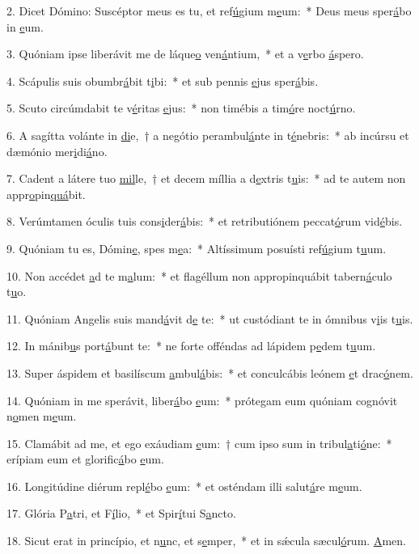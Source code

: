 2. Dicet Dómino: Suscéptor meus es tu, et ref\uline{ú}gium m\uline{e}um:~* Deus meus sper\uline{á}bo in \uline{e}um.\par 
3. Quóniam ipse liberávit me de láque\uline{o} ven\uline{á}ntium,~* et a v\uline{e}rbo \uline{á}spero.\par 
4. Scápulis suis obumbr\uline{á}bit t\uline{i}bi:~* et sub pennis \uline{e}jus sper\uline{á}bis.\par 
5. Scuto circúmdabit te v\uline{é}ritas \uline{e}jus:~* non timébis a tim\uline{ó}re noct\uline{ú}rno.\par 
6. A sagítta volánte in \uline{di}e,~† a negótio perambul\uline{á}nte in t\uline{é}nebris:~* ab incúrsu et dæmónio mer\uline{i}di\uline{á}no.\par 
7. Cadent a látere tuo \uline{mil}le,~† et decem míllia a d\uline{e}xtris t\uline{u}is:~* ad te autem non appr\uline{o}pin\uline{quá}bit.\par 
8. Verúmtamen óculis tuis cons\uline{i}der\uline{á}bis:~* et retributiónem peccat\uline{ó}rum vid\uline{é}bis.\par 
9. Quóniam tu es, Dómin\uline{e}, spes m\uline{e}a:~* Altíssimum posuísti ref\uline{ú}gium t\uline{u}um.\par 
10. Non accédet \uline{a}d te m\uline{a}lum:~* et flagéllum non appropinquábit tabern\uline{á}culo t\uline{u}o.\par 
11. Quóniam Angelis suis mand\uline{á}vit d\uline{e} te:~* ut custódiant te in ómnibus v\uline{i}is t\uline{u}is.\par 
12. In mánib\uline{u}s port\uline{á}bunt te:~* ne forte offéndas ad lápidem p\uline{e}dem t\uline{u}um.\par 
13. Super áspidem et basilíscum \uline{a}mbul\uline{á}bis:~* et conculcábis leónem \uline{e}t drac\uline{ó}nem.\par 
14. Quóniam in me sperávit, liber\uline{á}bo \uline{e}um:~* prótegam eum quóniam cognóvit n\uline{o}men m\uline{e}um.\par 
15. Clamábit ad me, et ego exáudiam \uline{e}um:~† cum ipso sum in tribul\uline{a}ti\uline{ó}ne:~* erípiam eum et glorific\uline{á}bo \uline{e}um.\par 
16. Longitúdine diérum repl\uline{é}bo \uline{e}um:~* et osténdam illi salut\uline{á}re m\uline{e}um.\par 
17. Glória P\uline{a}tri, et F\uline{í}lio,~* et Spir\uline{í}tui S\uline{a}ncto.\par 
18. Sicut erat in princípio, et n\uline{u}nc, et s\uline{e}mper,~* et in sǽcula sæcul\uline{ó}rum. \uline{A}men.\par 
